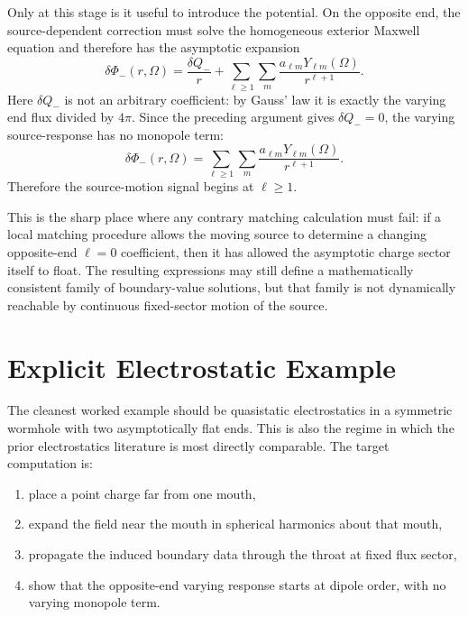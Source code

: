 \documentclass[aps,prd,onecolumn,nofootinbib,superscriptaddress]{revtex4-2}
\begin{document}
Only at this stage is it useful to introduce the potential. On the opposite end, the source-dependent correction must solve the homogeneous exterior Maxwell equation and therefore has the asymptotic expansion
\begin{equation}
\delta \Phi_{-}(r,\Omega)
= \frac{\delta Q_{-}}{r}
+ \sum_{\ell \ge 1}\sum_m \frac{a_{\ell m}Y_{\ell m}(\Omega)}{r^{\ell+1}}.
\end{equation}
Here $\delta Q_-$ is not an arbitrary coefficient: by Gauss' law it is exactly the varying end flux divided by $4\pi$. Since the preceding argument gives $\delta Q_{-}=0$, the varying source-response has no monopole term:
\begin{equation}
\delta \Phi_{-}(r,\Omega)
= \sum_{\ell \ge 1}\sum_m \frac{a_{\ell m}Y_{\ell m}(\Omega)}{r^{\ell+1}}.
\end{equation}
Therefore the source-motion signal begins at $\ell \ge 1$.

This is the sharp place where any contrary matching calculation must fail: if a local matching procedure allows the moving source to determine a changing opposite-end $\ell=0$ coefficient, then it has allowed the asymptotic charge sector itself to float. The resulting expressions may still define a mathematically consistent family of boundary-value solutions, but that family is not dynamically reachable by continuous fixed-sector motion of the source.

\section{Explicit Electrostatic Example}

The cleanest worked example should be quasistatic electrostatics in a symmetric wormhole with two asymptotically flat ends. This is also the regime in which the prior electrostatics literature is most directly comparable.\cite{Krasnikov2008ElectrostaticInteraction,KhusnutdinovBakhmatov2007SelfForce} The target computation is:
\begin{enumerate}
    \item place a point charge far from one mouth,
    \item expand the field near the mouth in spherical harmonics about that mouth,
    \item propagate the induced boundary data through the throat at fixed flux sector,
    \item show that the opposite-end varying response starts at dipole order, with no varying monopole term.
\end{enumerate}
\end{document}
